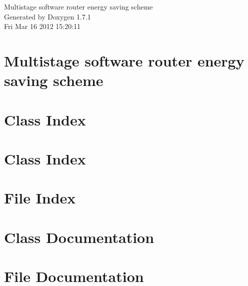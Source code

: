 \documentclass[a4paper]{book}
\begin{document}
\hypersetup{pageanchor=false}
\begin{titlepage}
\vspace*{7cm}
\begin{center}
{\Large Multistage software router energy saving scheme }\\
\vspace*{1cm}
{\large Generated by Doxygen 1.7.1}\\
\vspace*{0.5cm}
{\small Fri Mar 16 2012 15:20:11}\\
\end{center}
\end{titlepage}
\clearemptydoublepage
{}
\tableofcontents
\clearemptydoublepage
{}
\hypersetup{pageanchor=true}
\chapter{Multistage software router energy saving scheme}
\label{index}\hypertarget{index}{}
\chapter{Class Index}

\chapter{Class Index}

\chapter{File Index}

\chapter{Class Documentation}








\chapter{File Documentation}






















\printindex
\end{document}
